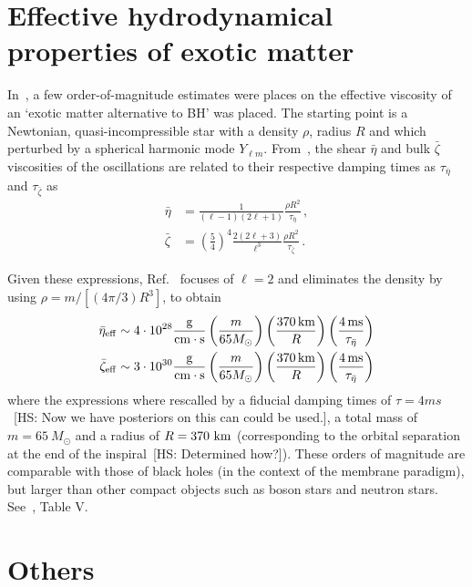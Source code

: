 \documentclass[aps,prd,10pt,preprint,
               notitlepage,onecolumn,superscriptaddress,
               eqsecnum,
               nofootinbib,tightenlines,floatfix]{revtex4-2}
\newcommand{\hs}[1]{{\color{magenta}[HS: #1]}}
\begin{document}
\section{Effective hydrodynamical properties of exotic matter}

In~\cite{Yunes:2016jcc}, a few order-of-magnitude estimates were places on the effective
viscosity of an `exotic matter alternative to BH' was placed.
%
The starting point is a Newtonian, quasi-incompressible star with a density $\rho$,
radius $R$ and which perturbed by a spherical harmonic mode $Y_{\ell m}$.
%
From~\cite{Cutler:1987ApJ314}, the shear $\bar{\eta}$ and bulk $\bar{\zeta}$ viscosities of the oscillations are related to their
respective damping times as $\tau_{\bar{\eta}}$ and $\tau_{\bar{\zeta}}$ as
%
\begin{align}
    \bar{\eta}  &= \frac{1}{(\ell - 1) (2\ell + 1)} \frac{\rho R^2}{\tau_{\bar{\eta}}}\,,
    \\
    \bar{\zeta} &= \left(\frac{5}{4}\right)^{4} \frac{2 (2\ell +3)}{\ell^3} \frac{\rho R^2}{\tau_{\bar{\zeta}}}\,.
\end{align}
%

Given these expressions, Ref.~\cite{Yunes:2016jcc} focuses of $\ell = 2$ and eliminates the density by using
$\rho = m / [(4 \pi / 3) R^3]$, to obtain
%
\begin{align}
    \bar{\eta}_{\rm eff} &\sim 4 \cdot 10^{28} \frac{{\rm g}}{{\rm cm} \cdot {\rm s}}
    \left( \frac{m}{65 M_{\odot}} \right)
    \left( \frac{370 \, {\rm km}}{R} \right)
    \left( \frac{4 \, {\rm ms}}{\tau_{\bar{\eta}}} \right)
    \\
    \bar{\zeta}_{\rm eff} &\sim 3 \cdot 10^{30} \frac{{\rm g}}{{\rm cm} \cdot {\rm s}}
    \left( \frac{m}{65 M_{\odot}} \right)
    \left( \frac{370 \, {\rm km}}{R} \right)
    \left( \frac{4 \, {\rm ms}}{\tau_{\bar{\eta}}} \right)
\end{align}
%
where the expressions where rescalled by a fiducial damping times of $\tau = 4 ms$~\hs{Now we have posteriors on
this can could be used.}, a total mass of $m = 65~M_{\odot}$ and a radius of $R = 370~{\rm km}$ (corresponding to
the orbital separation at the end of the inspiral~\hs{Determined how?}).
%
These orders of magnitude are comparable with those of black holes (in the context of the membrane paradigm), but
larger than other compact objects such as boson stars and neutron stars. See~\cite{Yunes:2016jcc}, Table V.

\section{Others}
\end{document}
